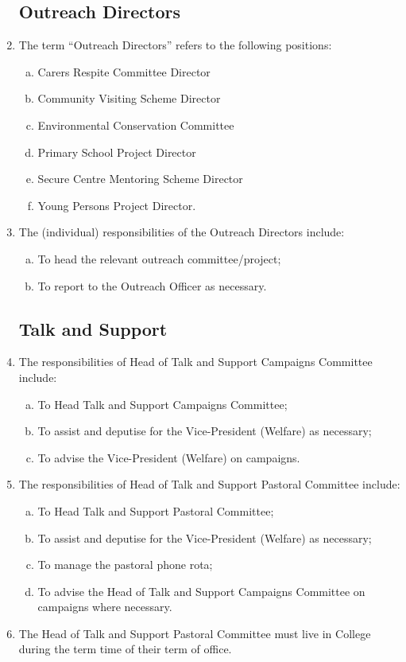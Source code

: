 \documentclass[12pt]{article}  %
\begin{document}
\begin{enumerate}
    \subsection{Outreach Directors}
    \item The term “Outreach Directors” refers to the following positions:
    \begin{enumerate}[(a)]
        \item Carers Respite Committee Director
        \item Community Visiting Scheme Director
        \item Environmental Conservation Committee
        \item Primary School Project Director
        \item Secure Centre Mentoring Scheme Director
        \item Young Persons Project Director.
    \end{enumerate}
    \item The (individual) responsibilities of the Outreach Directors include:
    \begin{enumerate}[(a)]
        \item To head the relevant outreach committee/project;
        \item To report to the Outreach Officer as necessary.
    \end{enumerate}
    \subsection{Talk and Support}
    \item The responsibilities of Head of Talk and Support Campaigns Committee include:
    \begin{enumerate}[(a)]
        \item To Head Talk and Support Campaigns Committee;
        \item To assist and deputise for the Vice-President (Welfare) as necessary;
        \item To advise the Vice-President (Welfare) on campaigns.
    \end{enumerate}
    \item The responsibilities of Head of Talk and Support Pastoral Committee include:
    \begin{enumerate}[(a)]
        \item To Head Talk and Support Pastoral Committee;
        \item To assist and deputise for the Vice-President (Welfare) as necessary;
        \item To manage the pastoral phone rota;
        \item To advise the Head of Talk and Support Campaigns Committee on campaigns where necessary.
    \end{enumerate}
    \item The Head of Talk and Support Pastoral Committee must live in College during the term time of their term of office.

\end{enumerate}
\end{document}
